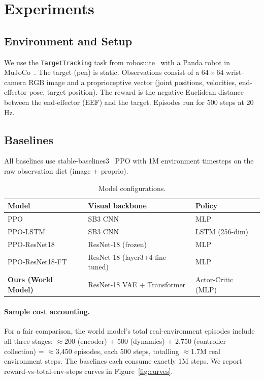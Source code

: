 \documentclass{article}
\begin{document}
\section{Experiments}

\subsection{Environment and Setup}

We use the \texttt{TargetTracking} task from robosuite~\cite{zhu2020robosuite} with a
Panda robot in MuJoCo~\cite{todorov2012mujoco}.
The target (pen) is static.
Observations consist of a $64\times64$ wrist-camera RGB image and a proprioceptive
vector (joint positions, velocities, end-effector pose, target position).
The reward is the negative Euclidean distance between the end-effector (EEF) and the
target.
Episodes run for 500 steps at 20 Hz.

\subsection{Baselines}

All baselines use stable-baselines3~\cite{stable-baselines3} PPO with 1M environment
timesteps on the raw observation dict (image + proprio).

\begin{table}[h]
\centering
\caption{Model configurations.}
\label{tab:configs}
\small
\begin{tabular}{lll}
\toprule
Model & Visual backbone & Policy \\
\midrule
PPO & SB3 CNN & MLP \\
PPO-LSTM & SB3 CNN & LSTM (256-dim) \\
PPO-ResNet18 & ResNet-18 (frozen) & MLP \\
PPO-ResNet18-FT & ResNet-18 (layer3+4 fine-tuned) & MLP \\
\textbf{Ours (World Model)} & ResNet-18 VAE + Transformer & Actor-Critic (MLP) \\
\bottomrule
\end{tabular}
\end{table}

\paragraph{Sample cost accounting.}
For a fair comparison, the world model's total real-environment episodes include
all three stages: $\approx$200 (encoder) + 500 (dynamics) + 2{,}750 (controller
collection) = $\approx$3{,}450 episodes, each 500 steps, totalling
$\approx$1.7M real environment steps.
The baselines each consume exactly 1M steps.
We report reward-vs-total-env-steps curves in Figure~\ref{fig:curves}.
\end{document}
